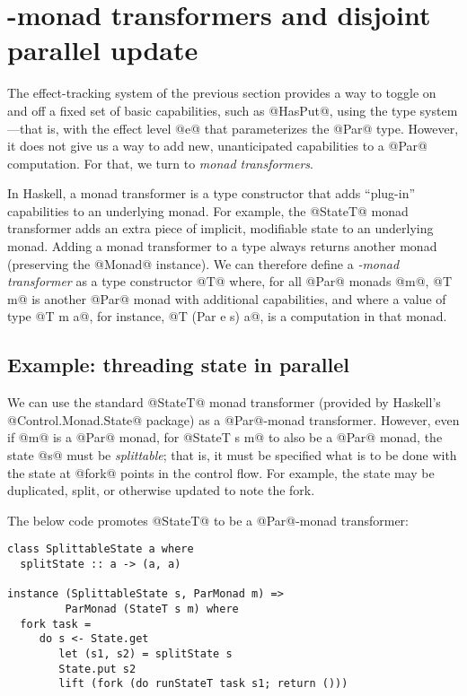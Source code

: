 \section{-monad transformers and disjoint parallel update}\label{s:lvish-disjoint}


The effect-tracking system of the previous section provides a way to
toggle on and off a fixed set of basic capabilities, such as @HasPut@,
using the type system---that is, with the effect level @e@ that
parameterizes the @Par@ type.  However, it does not give us a way to
add new, unanticipated capabilities to a @Par@ computation.  For that,
we turn to \emph{monad transformers}.

In Haskell, a monad transformer is a type constructor that adds
``plug-in'' capabilities to an underlying monad.  For example, the
@StateT@ monad transformer adds an extra piece of implicit, modifiable
state to an underlying monad.  Adding a monad transformer to a type
always returns another monad (preserving the @Monad@ instance).  We
can therefore define a \emph{-monad transformer} as a type
constructor @T@ where, for all @Par@ monads @m@, @T m@ is another
@Par@ monad with additional capabilities, and where a value of type
@T m a@, for instance, @T (Par e s) a@, is a computation in that monad.

\subsection{Example: threading state in parallel}

We can use the standard @StateT@ monad transformer (provided by
Haskell's @Control.Monad.State@ package) as a @Par@-monad transformer.
However, even if @m@ is a @Par@ monad, for @StateT s m@ to also be a
@Par@ monad, the state @s@ must be \emph{splittable}; that is, it must
be specified what is to be done with the state at @fork@ points in the
control flow.  For example, the state may be duplicated, split, or
otherwise updated to note the fork.

The below code promotes @StateT@ to be a @Par@-monad transformer:

\singlespacing
\begin{lstlisting}
class SplittableState a where
  splitState :: a -> (a, a)

instance (SplittableState s, ParMonad m) => 
         ParMonad (StateT s m) where  
  fork task =
     do s <- State.get 
        let (s1, s2) = splitState s
        State.put s2
        lift (fork (do runStateT task s1; return ()))
\end{lstlisting}
\doublespacing

